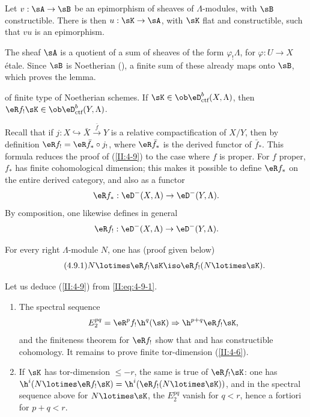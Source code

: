 \begin{lemma_}\label{II:4-8}
Let $v:\sA\to \sB$ be an epimorphism of sheaves of $\Lambda$-modules, with
$\sB$ constructible. There is then $u:\sK\to \sA$, with $\sK$ flat and
constructible, such that $v u$ is an epimorphism.
\end{lemma_}

The sheaf $\sA$ is a quotient of a sum of sheaves of the form
$\varphi_! \Lambda$, for $\varphi:U\to X$ étale. Since $\sB$ is Noetherian
(), a finite sum of these already maps onto $\sB$, which
proves the lemma.






\begin{theorem_}\label{II:4-9}
 of finite type of Noetherian schemes.
If $\sK\in\ob\eD_\textnormal{ctf}^b(X,\Lambda)$, then
$\eR f_!\sK\in \ob\eD_\textnormal{ctf}^b(Y,\Lambda)$.
\end{theorem_}

Recall that if $j:X\hookrightarrow \bar X \xrightarrow{\bar f} Y$ is a
relative compactification of $X/Y$, then by definition
$\eR f_! = \eR \bar f_* \circ j_!$, where $\eR \bar f_*$ is the derived
functor of $\bar f_*$. This formula reduces the proof of (\ref{II:4-9}) to
the case where $f$ is proper. For $f$ proper, $f_*$ has finite cohomological
dimension; this makes it possible to define $\eR f_*$ on the entire derived
category, and also as a functor
\[
  \eR f_* : \eD^-(X,\Lambda) \to \eD^-(Y,\Lambda) \text{.}
\]
By composition, one likewise defines in general
\[
  \eR f_! : \eD^-(X,\Lambda) \to \eD^-(Y,\Lambda) \text{.}
\]

For every right $\Lambda$-module $N$, one has (proof given below)
\begin{equation*}\tag{4.9.1}\label{II:eq:4-9-1}
  N\lotimes \eR f_! \sK \iso \eR f_! (N\lotimes \sK) \text{.}
\end{equation*}

Let us deduce (\ref{II:4-9}) from \eqref{II:eq:4-9-1}.
\begin{enumerate}[\indent a)]
  \item The spectral sequence
    \[
      E_2^{p q} = \eR^p f_! \h^q(\sK) \Rightarrow \h^{p+q} \eR f_! \sK \text{,}
    \]
    and the finiteness theorem for $\eR f_!$ show that
     and has constructible cohomology.
    It remains to prove finite tor-dimension (\ref{II:4-6}).
  \item If $\sK$ has tor-dimension $\leqslant -r$, the same is true of
    $\eR f_! \sK$: one has
    $\h^i(N\lotimes \eR f_! \sK) = \h^i(\eR f_!(N\lotimes \sK))$, and in the
    spectral sequence above for $N\lotimes \sK$, the $E_2^{p q}$ vanish for
    $q<r$, hence a fortiori for $p+q<r$.
\end{enumerate}

